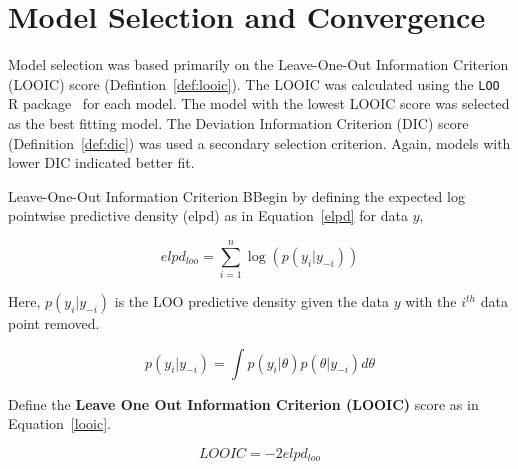 \section{Model Selection and Convergence}
Model selection was based primarily on the Leave-One-Out Information Criterion (LOOIC) score (Defintion~\ref{def:looic}). The LOOIC was calculated using the \verb|LOO| R package~\cite{loo} for each model. The model with the lowest LOOIC score was selected as the best fitting model. The Deviation Information Criterion (DIC) score (Definition~\ref{def:dic}) was used a secondary selection criterion. Again, models with lower DIC indicated better fit.

\begin{definition}[label=def:looic]{Leave-One-Out Information Criterion}
    BBegin by defining the expected log pointwise predictive density (elpd) as in Equation~\ref{elpd} for data $y$,
    
    \begin{equation}
        elpd_{loo} = \sum_{i = 1}^n \log(p(y_i | y_{-i}))
        \label{elpd}
    \end{equation}
    
    Here, $p(y_i|y_{-i})$ is the LOO predictive density given the data $y$ with the $i^{th}$ data point removed.
    
    \begin{equation}
        p(y_i | y_{-i}) = \int p(y_i|\theta)p(\theta|y_{-i})d\theta
        \label{loopd}
    \end{equation}
    
    Define the \textbf{Leave One Out Information Criterion (LOOIC)} score as in Equation~\ref{looic}.
    
    \begin{equation}
        LOOIC = -2elpd_{loo}
        \label{looic}
    \end{equation}
\end{definition}

